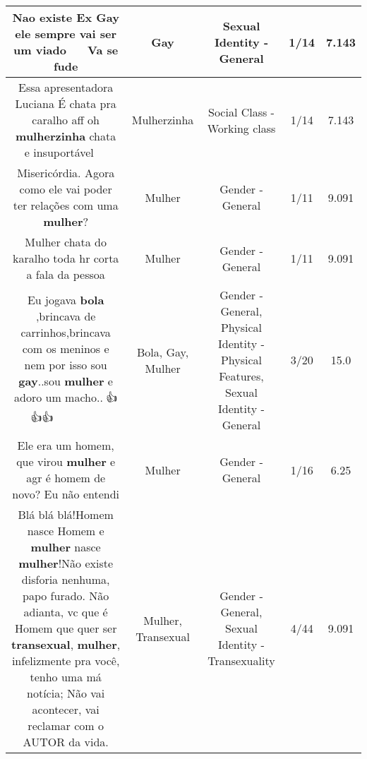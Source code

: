 \documentclass[11pt]{article}
\newlength\mylength
\begin{document}
\begin{center}
\begin{longtable}{|C{.65\mylength}|C{.30\mylength}|C{.12\mylength}|C{.12\mylength}|C{.12\mylength}|}
  \small Nao existe Ex \textbf{Gay}  ele sempre vai ser um viado  🖕🖕🖕🖕 Va se fude\normalsize   & Gay & Sexual Identity - General & 1/14 & 7.143 \\  \hline
  \small Essa apresentadora Luciana É chata pra caralho aff oh \textbf{mulherzinha} chata e insuportável 😤😤😤\normalsize   & Mulherzinha & Social Class - Working class & 1/14 & 7.143 \\  \hline
  \small Misericórdia. Agora como ele vai poder ter relações com uma \textbf{mulher}?\normalsize   & Mulher & Gender - General & 1/11 & 9.091 \\  \hline
  \small Mulher chata do karalho toda hr corta a fala da pessoa\normalsize   & Mulher & Gender - General & 1/11 & 9.091 \\  \hline
  \small Eu jogava \textbf{bola} ,brincava de carrinhos,brincava com os meninos e nem por isso sou \textbf{gay}..sou \textbf{mulher} e adoro um macho..👊👍👍👍💪💪💪💙💙💙🌺🌺🌹🌹🌺🌺💑💑💑\normalsize   & Bola, Gay, Mulher & Gender - General, Physical Identity - Physical Features, Sexual Identity - General & 3/20 & 15.0 \\  \hline
  \small Ele era um homem, que virou \textbf{mulher} e agr é homem de novo? Eu não entendi\normalsize   & Mulher & Gender - General & 1/16 & 6.25 \\  \hline
  \small Blá blá blá!Homem nasce Homem e \textbf{mulher} nasce \textbf{mulher}!Não existe disforia nenhuma, papo furado. Não adianta, vc que é Homem que quer ser \textbf{transexual}, \textbf{mulher}, infelizmente pra você, tenho uma má notícia; Não vai acontecer, vai reclamar com o AUTOR da vida.\normalsize   & Mulher, Transexual & Gender - General, Sexual Identity - Transexuality & 4/44 & 9.091 \\  \hline

\end{longtable}
\end{center}
\end{document}
